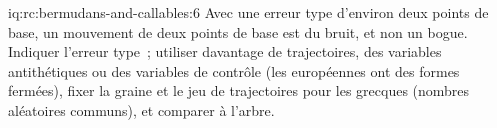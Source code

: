 \begin{solution}{iq:rc:bermudans-and-callables:6}
Avec une erreur type d'environ deux points de base, un mouvement de deux points de base est
du bruit, et non un bogue. Indiquer l'erreur type~; utiliser davantage de trajectoires, des variables antithétiques ou
des variables de contrôle (les européennes ont des formes fermées), fixer la graine et le
jeu de trajectoires pour les grecques (nombres aléatoires communs), et comparer à l'arbre.
\end{solution}
